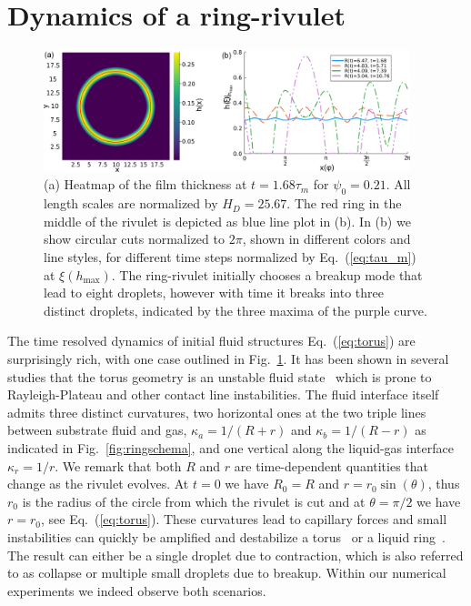 \documentclass[twoside,twocolumn,9pt]{article}
\begin{document}
\section{Dynamics of a ring-rivulet}
\label{sec:dynamics}
\begin{figure}
    \centering
    \includegraphics[width=0.95\textwidth]{assets/heatcirc.png}
    \caption{(a) Heatmap of the film thickness at $t=1.68\tau_m$ for $\psi_0 = 0.21$. 
    All length scales are normalized by $H_D = 25.67$. 
    The red ring in the middle of the rivulet is depicted as blue line plot in (b).
    In (b) we show circular cuts normalized to $2\pi$, shown in different colors and line styles, for different time steps normalized by Eq.~(\ref{eq:tau_m}) at $\xi(h_{\max})$.
    The ring-rivulet initially chooses a breakup mode that lead to eight droplets, however with time it breaks into three distinct droplets, indicated by the three maxima of the purple curve.}
    \label{fig:ThreeDToOneD}
\end{figure}
The time resolved dynamics of initial fluid structures Eq.~(\ref{eq:torus}) are surprisingly rich, with one case outlined in Fig.~\ref{fig:ThreeDToOneD}.
It has been shown in several studies that the torus geometry is an unstable fluid state~\cite{gonzalezStabilityLiquidRing2013, mehrabianCapillaryBreakupLiquid2013, edwardsControllingBreakupToroidal2021, wuBreakupPatternedNanoscale2010} which is prone to Rayleigh-Plateau and other contact line instabilities. 
The fluid interface itself admits three distinct curvatures, two horizontal ones at the two triple lines between substrate fluid and gas, $\kappa_a = 1/(R+r)$ and $\kappa_b = 1/(R-r)$ as indicated in Fig.~\ref{fig:ringschema}, and one vertical along the liquid-gas interface $\kappa_r = 1/r$.
We remark that both $R$ and $r$ are time-dependent quantities that change as the rivulet evolves.
At $t=0$ we have $R_0 = R$ and $r = r_0\sin(\theta)$, thus $r_0$ is the radius of the circle from which the rivulet is cut and at $\theta = \pi/2$ we have $r=r_0$, see Eq.~(\ref{eq:torus}).
These curvatures lead to capillary forces and small instabilities can quickly be amplified and destabilize a torus~\cite{mehrabianCapillaryBreakupLiquid2013} or a liquid ring~\cite{gonzalezStabilityLiquidRing2013}. 
The result can either be a single droplet due to contraction, which is also referred to as collapse or multiple small droplets due to breakup.
Within our numerical experiments we indeed observe both scenarios.
\end{document}

